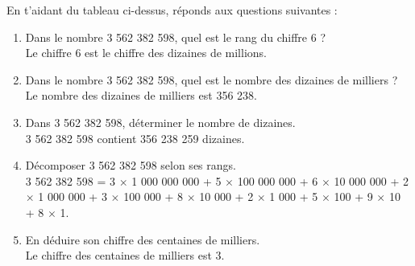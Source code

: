 \begin{Exemple}

En t'aidant du tableau ci-dessus, réponds aux questions suivantes : 
\begin{enumerate}
\item Dans le nombre 3 562 382 598, quel est le rang du chiffre 6 ?  \\
Le chiffre 6 est le chiffre des dizaines de millions.

\item Dans le nombre 3 562 382 598, quel est le nombre des dizaines de milliers ? \\
Le nombre des dizaines de milliers est 356 238.

\item Dans  3 562 382 598, déterminer le nombre de dizaines. \\
3  562 382 598 contient 356 238 259 dizaines.

\item Décomposer 3 562 382 598 selon ses rangs. \\
3 562 382 598 = 3 $\times$ 1 000 000 000 + 5 $\times$ 100 000 000 + 6 $\times$ 10 000 000 + 2 $\times$ 1 000 000 + 3 $\times$ 100 000 + 8 $\times$ 10 000 + 2 $\times$ 1 000 + 5 $\times$ 100 + 9 $\times$ 10 + 8 $\times$ 1.

\item En déduire son chiffre des centaines de milliers. \\
Le chiffre des centaines de milliers est 3.


\end{enumerate}
\end{Exemple}


